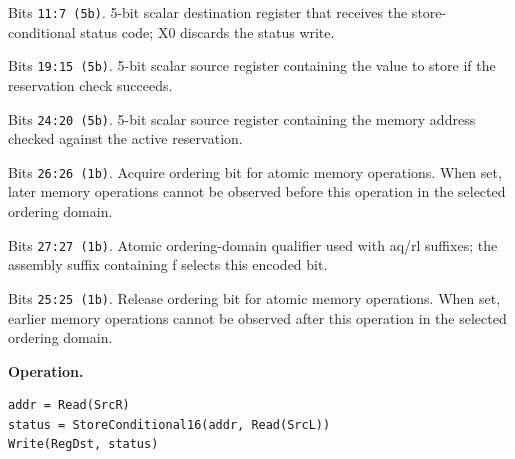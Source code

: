 \begin{description}[leftmargin=0.18\linewidth,style=nextline]
\item[\texttt{RegDst}] Bits \texttt{11:7 (5b)}. 5-bit scalar destination register that receives the store-conditional status code; X0 discards the status write.
\item[\texttt{SrcL}] Bits \texttt{19:15 (5b)}. 5-bit scalar source register containing the value to store if the reservation check succeeds.
\item[\texttt{SrcR}] Bits \texttt{24:20 (5b)}. 5-bit scalar source register containing the memory address checked against the active reservation.
\item[\texttt{aq}] Bits \texttt{26:26 (1b)}. Acquire ordering bit for atomic memory operations. When set, later memory operations cannot be observed before this operation in the selected ordering domain.
\item[\texttt{far}] Bits \texttt{27:27 (1b)}. Atomic ordering-domain qualifier used with aq/rl suffixes; the assembly suffix containing f selects this encoded bit.
\item[\texttt{rl}] Bits \texttt{25:25 (1b)}. Release ordering bit for atomic memory operations. When set, earlier memory operations cannot be observed after this operation in the selected ordering domain.
\end{description}
\noindent\textbf{Operation.}\par
\begin{lstlisting}[style=ptoscalarcode]
addr = Read(SrcR)
status = StoreConditional16(addr, Read(SrcL))
Write(RegDst, status)
\end{lstlisting}
\Needspace{0.08\textheight}
